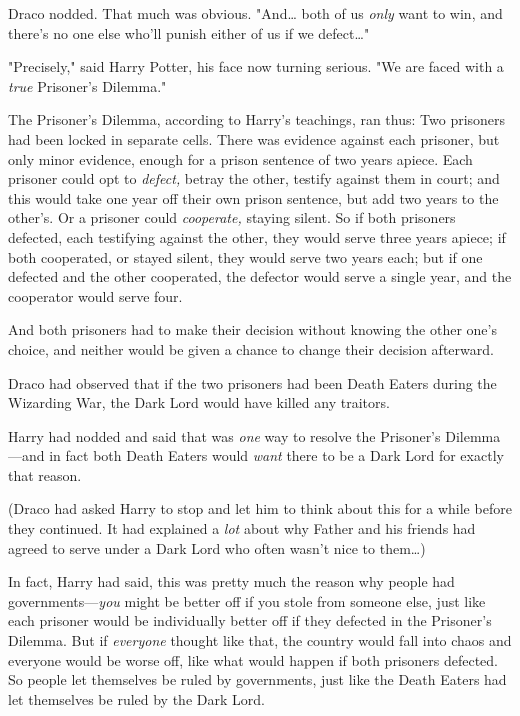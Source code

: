 Draco nodded. That much was obvious. "And{\ldots} both of us \emph{only} want 
to win, and there's no one else who'll punish either of us if we defect{\ldots}"

"Precisely," said Harry Potter, his face now turning serious. "We are faced 
with a \emph{true} Prisoner's Dilemma."

The Prisoner's Dilemma, according to Harry's teachings, ran thus: Two prisoners 
had been locked in separate cells. There was evidence against each prisoner, 
but only minor evidence, enough for a prison sentence of two years apiece. Each 
prisoner could opt to \emph{defect,} betray the other, testify against them in 
court; and this would take one year off their own prison sentence, but add two 
years to the other's. Or a prisoner could \emph{cooperate,} staying silent. So 
if both prisoners defected, each testifying against the other, they would serve 
three years apiece; if both cooperated, or stayed silent, they would serve two 
years each; but if one defected and the other cooperated, the defector would 
serve a single year, and the cooperator would serve four.

And both prisoners had to make their decision without knowing the other one's 
choice, and neither would be given a chance to change their decision afterward.

Draco had observed that if the two prisoners had been Death Eaters during the 
Wizarding War, the Dark Lord would have killed any traitors.

Harry had nodded and said that was \emph{one} way to resolve the Prisoner's 
Dilemma---and in fact both Death Eaters would \emph{want} there to be a Dark 
Lord for exactly that reason.

(Draco had asked Harry to stop and let him to think about this for a while 
before they continued. It had explained a \emph{lot} about why Father and his 
friends had agreed to serve under a Dark Lord who often wasn't nice to 
them{\ldots})

In fact, Harry had said, this was pretty much the reason why people had 
governments---\emph{you} might be better off if you stole from someone else, 
just like each prisoner would be individually better off if they defected in 
the Prisoner's Dilemma. But if \emph{everyone} thought like that, the country 
would fall into chaos and everyone would be worse off, like what would happen 
if both prisoners defected. So people let themselves be ruled by governments, 
just like the Death Eaters had let themselves be ruled by the Dark Lord.

